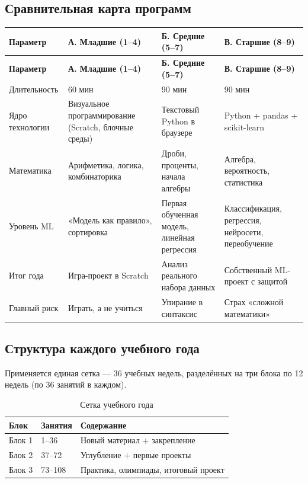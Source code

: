 \documentclass[12pt,a4paper]{article}
\begin{document}
\subsection{Сравнительная карта программ}

\begin{longtable}{L{3.2cm}L{3.7cm}L{3.7cm}L{3.7cm}}
\toprule
\textbf{Параметр} & \textbf{А. Младшие (1--4)} &
\textbf{Б. Средние (5--7)} & \textbf{В. Старшие (8--9)}\\
\midrule
\endfirsthead

\toprule
\textbf{Параметр} & \textbf{А. Младшие (1--4)} &
\textbf{Б. Средние (5--7)} & \textbf{В. Старшие (8--9)}\\
\midrule
\endhead

Длительность & 60 мин & 90 мин & 90 мин\\
\addlinespace
Ядро технологии &
Визуальное программирование
(Scratch, блочные среды) &
Текстовый Python в браузере &
Python + pandas + scikit-learn\\
\addlinespace
Математика & Арифметика, логика,
комбинаторика &
Дроби, проценты, начала алгебры &
Алгебра, вероятность, статистика\\
\addlinespace
Уровень ML & «Модель как правило»,
сортировка & Первая обученная модель,
линейная регрессия & Классификация, регрессия,
нейросети, переобучение\\
\addlinespace
Итог года & Игра-проект в Scratch &
Анализ реального набора данных &
Собственный ML-проект с защитой\\
\addlinespace
Главный риск &
Играть, а не учиться &
Упирание в синтаксис &
Страх «сложной математики»\\
\bottomrule
\end{longtable}

\subsection{Структура каждого учебного года}

Применяется единая сетка --- 36 учебных недель, разделённых на
три блока по 12 недель (по 36 занятий в каждом).

\begin{table}[H]
\centering
\caption{Сетка учебного года}
\label{tab:yeargrid}
\begin{tabular}{L{3.4cm}C{2.6cm}L{6.2cm}}
\toprule
\textbf{Блок} & \textbf{Занятия} & \textbf{Содержание}\\
\midrule
Блок 1 & 1--36 & Новый материал + закрепление\\
Блок 2 & 37--72 & Углубление + первые проекты\\
Блок 3 & 73--108 & Практика, олимпиады, итоговый проект\\
\bottomrule
\end{tabular}
\end{table}
\end{document}
